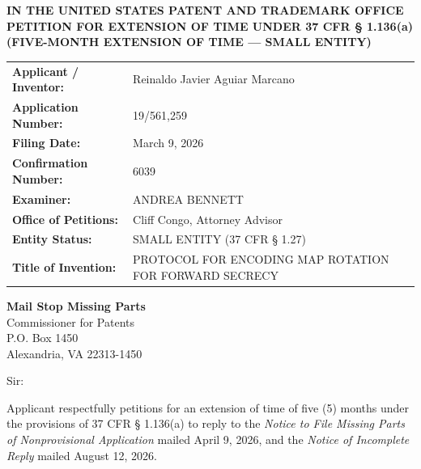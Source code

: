 \documentclass[11pt,letterpaper]{article}
\begin{document}
\thispagestyle{empty}

\begin{center}
    \textbf{\large IN THE UNITED STATES PATENT AND TRADEMARK OFFICE} \\
    \vspace{0.3cm}
    \textbf{\large PETITION FOR EXTENSION OF TIME UNDER 37 CFR \S{} 1.136(a)} \\
    \textbf{\normalsize (FIVE-MONTH EXTENSION OF TIME --- SMALL ENTITY)}
\end{center}

\vspace{0.4cm}
\noindent\begin{tabular}{p{2.3in}p{4.0in}}
\textbf{Applicant / Inventor:} & Reinaldo Javier Aguiar Marcano \\
\textbf{Application Number:} & 19/561,259 \\
\textbf{Filing Date:} & March 9, 2026 \\
\textbf{Confirmation Number:} & 6039 \\
\textbf{Examiner:} & ANDREA BENNETT \\
\textbf{Office of Petitions:} & Cliff Congo, Attorney Advisor \\
\textbf{Entity Status:} & SMALL ENTITY (37 CFR \S{} 1.27) \\
\textbf{Title of Invention:} & PROTOCOL FOR ENCODING MAP ROTATION FOR FORWARD SECRECY \\
\end{tabular}

\vspace{0.5cm}
\noindent\textbf{Mail Stop Missing Parts} \\
Commissioner for Patents \\
P.O. Box 1450 \\
Alexandria, VA 22313-1450

\vspace{0.2cm}
Sir:

Applicant respectfully petitions for an extension of time of five (5) months under the provisions of 37 CFR \S{} 1.136(a) to reply to the \textit{Notice to File Missing Parts of Nonprovisional Application} mailed April 9, 2026, and the \textit{Notice of Incomplete Reply} mailed August 12, 2026.
\end{document}
